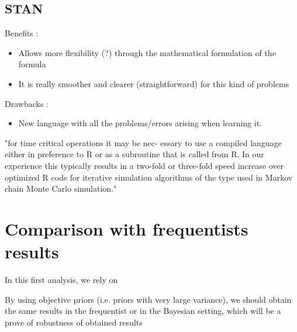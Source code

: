 \subsection{STAN}

Benefits : 

\begin{itemize}
	\item Allows more flexibility (?) through the mathematical formulation of the formula
	\item It is really smoother and clearer (straightforward) for this kind of problems 
\end{itemize}

Drawbacks : 

\begin{itemize}
	\item New language with all the problems/errors arising when learning it. 
\end{itemize}



"for time critical operations it may be nec-
essary to use a compiled language either in preference to R or as a subroutine that
is called from R. In our experience this typically results in a two-fold or three-fold
speed increase over optimized R code for iterative simulation algorithms of the type
used in Markov chain Monte Carlo simulation."

\section{Comparison with frequentists results}

In this first analysis, we rely on 


By using objective priors (i.e. priors with very large variance), we should obtain the same results in the frequentist or in the Bayesian setting, which will be a prove of robustness of obtained results  
